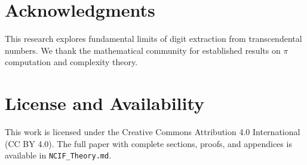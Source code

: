 \documentclass[12pt]{article}
\begin{document}
\section*{Acknowledgments}
This research explores fundamental limits of digit extraction from transcendental numbers. We thank the mathematical community for established results on $\pi$ computation and complexity theory.




\section*{License and Availability}
This work is licensed under the Creative Commons Attribution 4.0 International (CC BY 4.0).  
The full paper with complete sections, proofs, and appendices is available in \texttt{NCIF\_Theory.md}.
\end{document}
